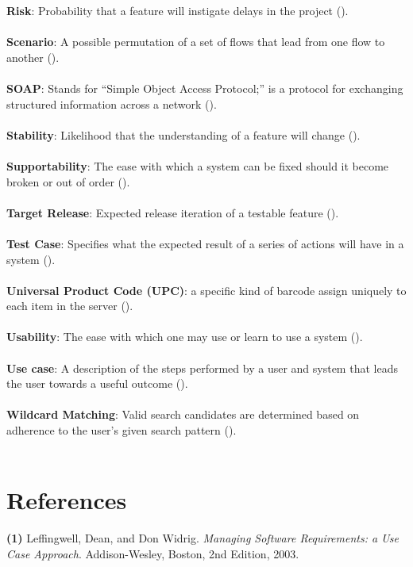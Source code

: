 \documentclass{article}
\begin{document}
\textbf{Risk}: Probability that a feature will instigate delays in the project (\pageref{feature}).\\ \\
\textbf{Scenario}: A possible permutation of a set of flows that lead from one flow to another (\pageref{scenario}).\\ \\
\textbf{SOAP}: Stands for ``Simple Object Access Protocol;'' is a protocol for exchanging structured information across a network (\pageref{soap}).\\ \\
\textbf{Stability}: Likelihood that the understanding of a feature will change (\pageref{feature}).\\ \\
\textbf{Supportability}: The ease with which a system can be fixed should it become broken or out of order (\pageref{support}).\\ \\
\textbf{Target Release}: Expected release iteration of a testable feature (\pageref{feature}).\\ \\
\textbf{Test Case}: Specifies what the expected result of a series of actions will have in a system (\pageref{test_case}).\\ \\
\textbf{Universal Product Code (UPC)}: a specific kind of barcode assign uniquely to each item in the server (\pageref{upc}).\\ \\
\textbf{Usability}: The ease with which one may use or learn to use a system (\pageref{usability}).\\ \\
\textbf{Use case}: A description of the steps performed by a user and system that leads the user towards a useful outcome (\pageref{use_case}).\\ \\
\textbf{Wildcard Matching}: Valid search candidates are determined based on adherence to the user's given search pattern (\pageref{feature}).\\ \\

\section{References}
\hangindent=1.4cm
\textbf{(1)} Leffingwell, Dean, and Don Widrig.
\emph{Managing Software Requirements: a Use Case Approach}.
Addison-Wesley, Boston,
2nd Edition,
2003.\\
\end{document}
